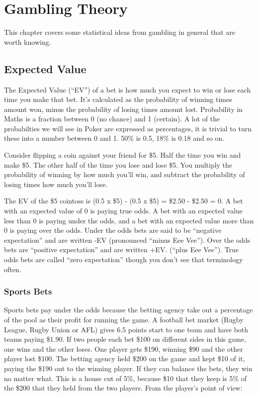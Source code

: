 \chapter{Gambling Theory}


This chapter covers some statistical ideas from gambling in general that
are worth knowing.

\section{Expected Value}

The Expected Value (``EV'') of a bet is how much you expect to win or lose
each time you make that bet. It's calculated as the probability of
winning times amount won, minus the probability of losing times amount
lost. Probability in Maths is a fraction between 0 (no chance)
and 1 (certain). A lot of the probabilties we will see in Poker
are expressed as percentages, it is trivial to turn these into a number
between 0 and 1. 50\% is 0.5, 18\% is 0.18 and so on.

Consider flipping a coin against your friend
for \$5. Half the time you win and make \$5. The other half of the
time you lose and lose \$5. You multiply the probability of winning
by how much you'll win, and subtract the probability of losing times
how much you'll lose.

The EV of the \$5 cointoss is (0.5 x \$5) - (0.5 x \$5)
= \$2.50 - \$2.50 = 0. A bet with an expected value of 0 is
paying true odds. A bet with an expected value less than 0 is
paying under the odds, and a bet with an expected value more than
0 is paying over the odds. Under the odds bets are said to be
``negative expectation'' and are written -EV (pronounced ``minus Eee Vee'').
Over the odds bets are ``positive expectation'' and are written +EV.
(``plus Eee Vee''). True odds bets are called ``zero expectation''
though you don't see that terminology often.

\subsection*{Sports Bets}
Sports bets pay under the odds because the betting agency take out a
percentage of the pool as their profit for running the game. A
football bet market (Rugby League, Rugby Union or AFL) gives 6.5
points start to one team and have both teams paying \$1.90. If two
people each bet \$100 on different sides in this game, one wins and
the other loses. One player gets \$190, winning \$90 and the other
player lost \$100. The betting agency held \$200 on the game and kept
\$10 of it, paying the \$190 out to the winning player. If they can
balance the bets, they win no matter what. This is a house cut of 5\%,
because \$10 that they keep is 5\% of the \$200 that they held from
the two players. From the player's point of view:

